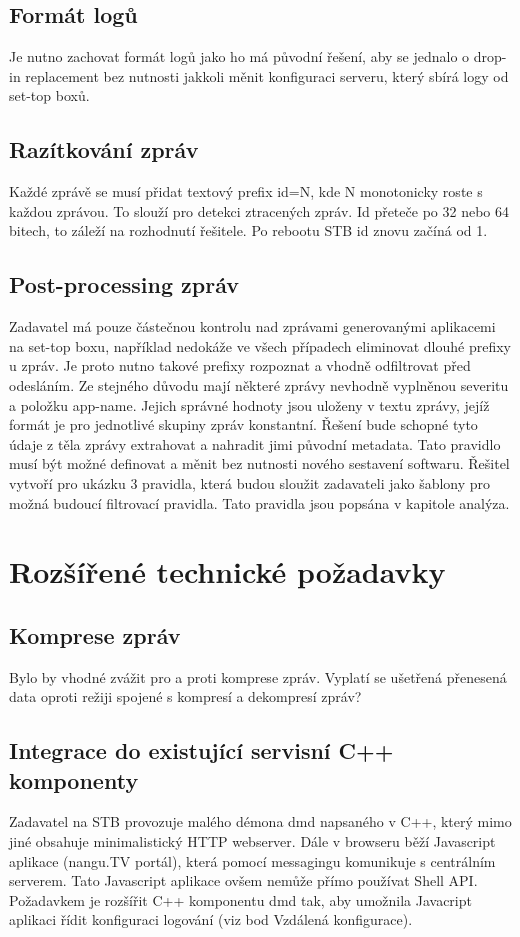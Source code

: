 \documentclass[thesis=B,czech]{FITthesis}[2012/06/26]
\begin{document}
\subsection{Formát logů}
Je nutno zachovat formát logů jako ho má původní řešení, aby se jednalo o drop-in replacement bez nutnosti jakkoli měnit konfiguraci serveru, který sbírá logy od set-top boxů.

\subsection{Razítkování zpráv}
Každé zprávě se musí přidat textový prefix id=N, kde N monotonicky roste s každou zprávou.  To slouží pro detekci ztracených zpráv. Id přeteče po 32 nebo 64 bitech, to záleží na rozhodnutí řešitele. Po rebootu STB id znovu začíná od 1.

\subsection{Post-processing zpráv}
Zadavatel má pouze částečnou kontrolu nad zprávami generovanými aplikacemi na set-top boxu, například nedokáže ve všech případech eliminovat dlouhé prefixy u zpráv. Je proto nutno takové prefixy rozpoznat a vhodně odfiltrovat před odesláním. Ze stejného důvodu mají některé zprávy nevhodně vyplněnou severitu a položku app-name. Jejich správné hodnoty jsou uloženy v textu zprávy, jejíž formát je pro jednotlivé skupiny zpráv konstantní. Řešení bude schopné tyto údaje z těla zprávy extrahovat a nahradit jimi původní metadata. Tato pravidlo musí být možné definovat a měnit bez nutnosti nového sestavení softwaru. 
Řešitel vytvoří pro ukázku 3 pravidla, která budou sloužit zadavateli jako šablony pro možná budoucí filtrovací pravidla. Tato pravidla jsou popsána v kapitole analýza.

\section{Rozšířené technické požadavky}

\subsection{Komprese zpráv}
Bylo by vhodné zvážit pro a proti komprese zpráv. Vyplatí se ušetřená přenesená data oproti režiji spojené s kompresí a dekompresí zpráv?

\subsection{Integrace do existující servisní C++ komponenty}
Zadavatel na STB provozuje malého démona dmd napsaného v C++, který mimo jiné obsahuje minimalistický HTTP webserver. Dále v browseru běží Javascript aplikace (nangu.TV portál), která pomocí messagingu komunikuje s centrálním serverem. Tato Javascript aplikace ovšem nemůže přímo používat Shell API.
Požadavkem je rozšířit C++ komponentu dmd tak, aby umožnila Javacript aplikaci řídit konfiguraci logování (viz bod Vzdálená konfigurace).
\end{document}
